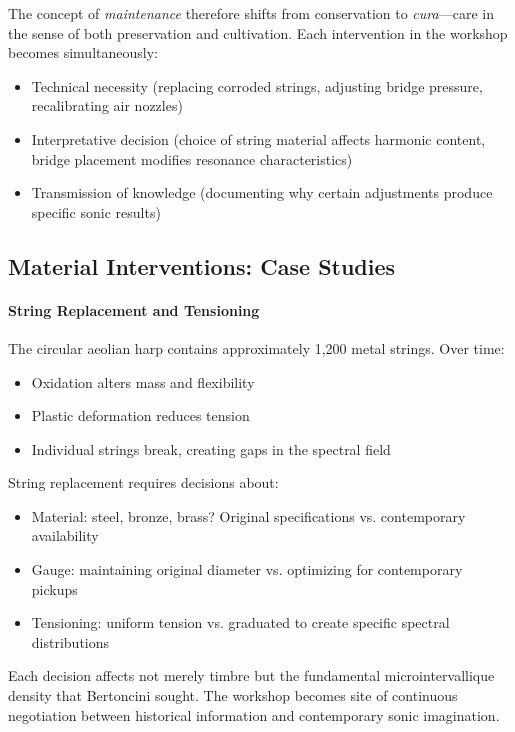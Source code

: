 The concept of \emph{maintenance} therefore shifts from conservation to 
\emph{cura}---care in the sense of both preservation and cultivation. Each 
intervention in the workshop becomes simultaneously:
\begin{itemize}
  \item Technical necessity (replacing corroded strings, adjusting bridge 
  pressure, recalibrating air nozzles)
  \item Interpretative decision (choice of string material affects harmonic 
  content, bridge placement modifies resonance characteristics)
  \item Transmission of knowledge (documenting why certain adjustments produce 
  specific sonic results)
\end{itemize}

\subsection{Material Interventions: Case Studies}

\paragraph{String Replacement and Tensioning}
The circular aeolian harp contains approximately 1,200 metal strings. Over time:
\begin{itemize}
  \item Oxidation alters mass and flexibility
  \item Plastic deformation reduces tension
  \item Individual strings break, creating gaps in the spectral field
\end{itemize}

String replacement requires decisions about:
\begin{itemize}
  \item Material: steel, bronze, brass? Original specifications vs. contemporary 
  availability
  \item Gauge: maintaining original diameter vs. optimizing for contemporary 
  pickups
  \item Tensioning: uniform tension vs. graduated to create specific spectral 
  distributions
\end{itemize}

Each decision affects not merely timbre but the fundamental microintervallique 
density that Bertoncini sought. The workshop becomes site of continuous 
negotiation between historical information and contemporary sonic imagination.

